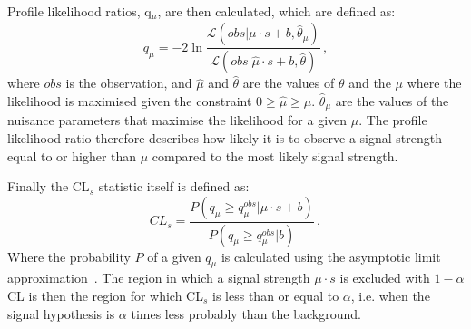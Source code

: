Profile likelihood ratios, q$_{\mu}$, are then calculated, which are defined as:
\begin{equation}
  \label{eq:proflikelihood}
  q_{\mu} = -2 \ln\frac{\mathcal{L}(obs|\mu \cdot s + b,\hat{\theta}_{\mu})}{\mathcal{L}(obs|\hat{\mu} \cdot s + b,\hat{\theta})}\,,
\end{equation}
where $obs$ is the observation, and $\hat{\mu}$ and $\hat{\theta}$ are the values of $\theta$ and the $\mu$ where the likelihood is maximised given the constraint $0 \geqslant \hat{\mu} \geqslant \mu$. $\hat{\theta}_{\mu}$ are the values of the nuisance parameters that maximise the likelihood for a given $\mu$. The profile likelihood ratio therefore describes how likely it is to observe a signal strength equal to or higher than $\mu$ compared to the most likely signal strength.

Finally the CL$_{s}$ statistic itself is defined as:
\begin{equation}
  \label{eq:cls}
  CL_{s} = \frac{P(q_{\mu}\geqslant q_{\mu}^{obs} | \mu \cdot s + b)}{P(q_{\mu}\geqslant q_{\mu}^{obs}|b)}\,,
\end{equation}
Where the probability $P$ of a given $q_{\mu}$ is calculated using the asymptotic limit approximation~\cite{Cowan:2010js}. The region in which a signal strength $\mu \cdot s$ is excluded with $1 - \alpha$ \ac{CL} is then the region for which CL$_{s}$ is less than or equal to $\alpha$, i.e. when the signal hypothesis is $\alpha$ times less probably than the background.
